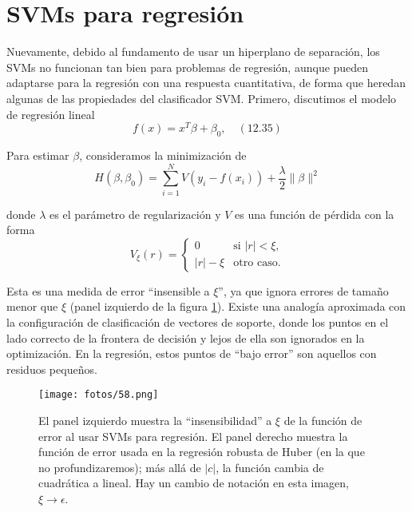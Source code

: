 \section{SVMs para regresión}

Nuevamente, debido al fundamento de usar un hiperplano de separación, los SVMs no funcionan tan bien para problemas de regresión, aunque pueden adaptarse para la regresión con una respuesta cuantitativa, de forma que heredan algunas de las propiedades del clasificador SVM. Primero, discutimos el modelo de regresión lineal
\begin{equation}
f(x) = x^T \beta + \beta_0, \quad (12.35)
\end{equation}

\noindent Para estimar $\beta$, consideramos la minimización de
\begin{equation}
H(\beta, \beta_0) = \sum_{i=1}^{N} V(y_i - f(x_i)) + \frac{\lambda}{2} \| \beta \|^2
\label{eq:12.36}
\end{equation}

\noindent donde $\lambda$ es el parámetro de regularización y $V$ es una función de pérdida con la forma
\begin{equation}
V_\xi(r) =
\begin{cases}
0 & \text{si } |r| < \xi, \\
|r| - \xi & \text{otro caso}.
\end{cases}
\end{equation}

Esta es una medida de error ``insensible a $\xi$'', ya que ignora errores de tamaño menor que $\xi$ (panel izquierdo de la figura \ref{fig:12.8}). Existe una analogía aproximada con la configuración de clasificación de vectores de soporte, donde los puntos en el lado correcto de la frontera de decisión y lejos de ella son ignorados en la optimización. En la regresión, estos puntos de ``bajo error'' son aquellos con residuos pequeños. \\

\begin{figure}[h]
\centering
\texttt{[image: fotos/58.png]}
\caption{El panel izquierdo muestra la ``insensibilidad'' a $\xi$ de la función de error al usar SVMs para regresión. El panel derecho muestra la función de error usada en la regresión robusta de Huber (en la que no profundizaremos); más allá de $|c|$, la función cambia de cuadrática a lineal. Hay un cambio de notación en esta imagen, $\xi \to \epsilon$.}
\label{fig:12.8}
\end{figure}


